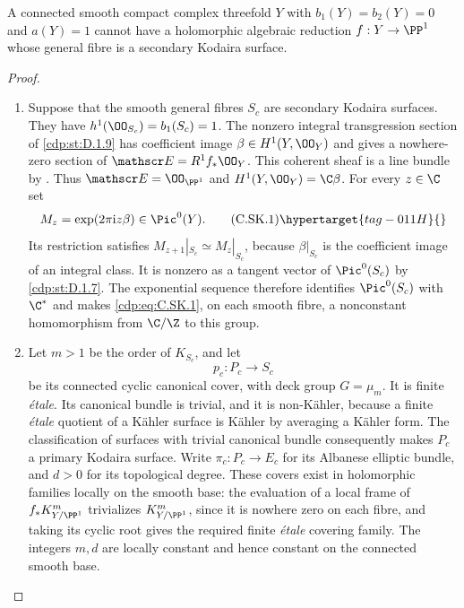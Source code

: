 \begin{proposition}\hypertarget{tag-01FF}{}\label{cdp:st:C.3.9}


A connected smooth compact complex threefold $Y$ with $b_1(Y)=b_2(Y)=0$ and
$a(Y)=1$ cannot have a holomorphic algebraic reduction
$f:Y\to\PP^1$ whose general fibre is a secondary Kodaira
surface.
\end{proposition}


\begin{proof}

\begin{enumerate}[label=\arabic*.,leftmargin=*]
\item Suppose that the smooth general fibres $S_c$ are secondary
Kodaira surfaces. They have $h^1(\OO_{S_c})=b_1(S_c)=1$.
The nonzero integral transgression section of \ref{cdp:st:D.1.9} has
coefficient image $\beta\in H^1(Y,\OO_Y)$ and gives a
nowhere-zero section of $\mathscr E=R^1f_*\OO_Y$.
This coherent sheaf is a line bundle by \cite[Theorem~2.2, pp.~4--5]{Viaclovsky2026Combs}. Thus
$\mathscr E=\OO_{\PP^1}$ and
$H^1(Y,\OO_Y)=\C\beta$. For every $z\in\C$ set
\[
 M_z=\exp(2\pi\mathrm i z\beta)\in\Pic^0(Y).
\tag{C.SK.1}\hypertarget{tag-011H}{}\label{cdp:eq:C.SK.1}
\]
Its restriction satisfies $M_{z+1}|_{S_c}\simeq M_z|_{S_c}$,
because $\beta|_{S_c}$ is the coefficient image of an
integral class. It is nonzero as a tangent vector of
$\Pic^0(S_c)$ by \ref{cdp:st:D.1.7}. The exponential sequence therefore
identifies $\Pic^0(S_c)$ with $\C^*$ and makes \eqref{cdp:eq:C.SK.1}, on
each smooth fibre, a nonconstant homomorphism from
$\C/\Z$ to this group.

\item Let $m>1$ be the order of $K_{S_c}$, and let
\[
 p_c:P_c\longrightarrow S_c
\]
be its connected cyclic canonical cover, with deck group
$G=\mu_m$. It is finite \emph{\'etale}. Its canonical bundle
is trivial, and it is non-K\"ahler, because a finite
\emph{\'etale} quotient of a K\"ahler surface is K\"ahler
by averaging a K\"ahler form. The classification of
surfaces with trivial canonical bundle consequently makes
$P_c$ a primary Kodaira surface. Write
$\pi_c:P_c\to E_c$ for its Albanese elliptic bundle, and
$d>0$ for its topological degree. These covers exist in
holomorphic families locally on the smooth base: the
evaluation of a local frame of $f_*K_{Y/\PP^1}^{m}$
trivializes $K_{Y/\PP^1}^{m}$, since it is nowhere zero on
each fibre, and taking its cyclic root gives the required
finite \emph{\'etale} covering family. The integers $m,d$
are locally constant and hence constant on the connected
smooth base.


\end{enumerate}
\end{proof}
